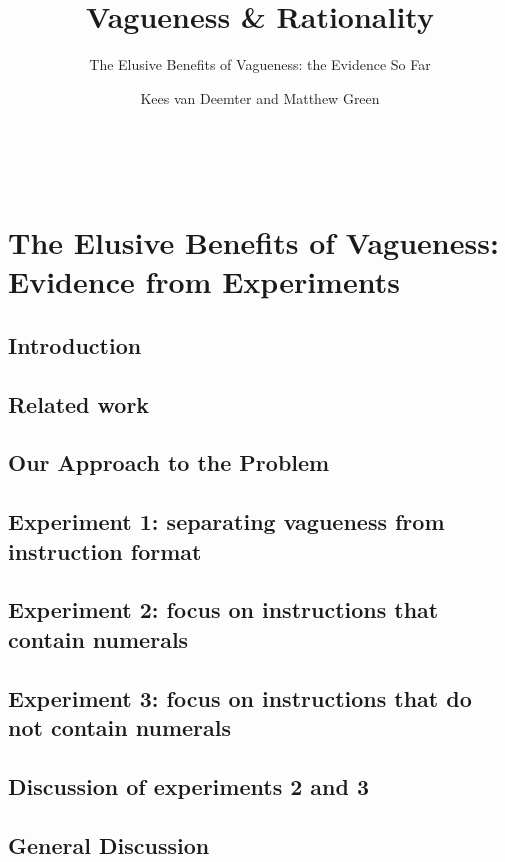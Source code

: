 \documentclass[ %
  graybox       %
 ,envcountchap  %
 ,sectrefs      %
 ,footinfo      %
 ,graphics      %
]{svmono}
\begin{document}
\author{Kees van Deemter and Matthew Green}
\title{Vagueness \& Rationality}
\subtitle{The Elusive Benefits of Vagueness: the Evidence So Far}
\newpage~\newpage
\maketitle
\frontmatter
\tableofcontents
\mainmatter
\chapter{The Elusive Benefits of Vagueness: Evidence from Experiments}\label{chapterlabel}

\section{Introduction}\label{introduction}
\section{Related work}\label{related-work}
\section{Our Approach to the Problem}\label{our-approach-to-the-problem}
\section{Experiment 1: separating vagueness from instruction format}\label{e1}
\section{Experiment 2: focus on instructions that contain numerals}\label{e2}
\section{Experiment 3: focus on instructions that do not contain numerals}\label{e3}
\section{Discussion of experiments 2 and 3}\label{discussion-of-e2-and-e3}
\section{General Discussion}\label{general-discussion}
\backmatter


\backmatter
\end{document}
